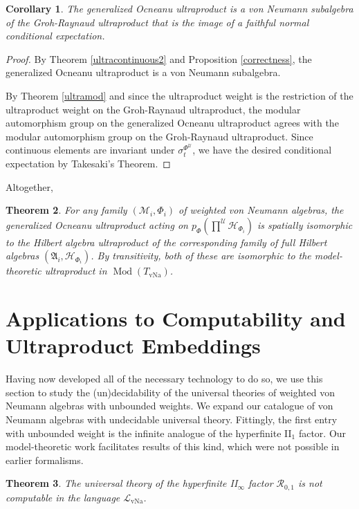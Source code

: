 \documentclass[12pt]{amsart}
\newtheorem{thm}{Theorem}[section]
\newtheorem{cor}[thm]{Corollary}
\theoremstyle{definition}
\def\cal{\mathcal}
\def \Md{\operatorname{Mod}}
\DeclareMathOperator{\vNa}{vNa}
\newcommand\cU{{\cal U}}
\newcommand\R{{\cal R}}
\begin{document}
\begin{cor}\label{GOisCornerOfGR}
    The generalized Ocneanu ultraproduct is a von Neumann subalgebra of the Groh-Raynaud ultraproduct that is the image of a faithful normal conditional expectation.
\end{cor}

\begin{proof}
    By Theorem \ref{ultracontinuous2} and Proposition \ref{correctness}, the generalized Ocneanu ultraproduct is a von Neumann subalgebra.

    By Theorem \ref{ultramod} and since the ultraproduct weight is the restriction of the ultraproduct weight on the Groh-Raynaud ultraproduct, the modular automorphism group on the generalized Ocneanu ultraproduct agrees with the modular automorphism group on the Groh-Raynaud ultraproduct.  Since continuous elements are invariant under $\sigma^{\Phi^{\cU}}_t$, we have the desired conditional expectation by Takesaki's Theorem.
\end{proof}

Altogether,

\begin{thm}
    For any family $(\cal M_i, \Phi_i)$ of weighted von Neumann algebras, the generalized Ocneanu ultraproduct acting on $p_{\Phi}(\prod^{\cU} \cal H_{\Phi_i})$ is spatially isomorphic to the Hilbert algebra ultraproduct of the corresponding family of full Hilbert algebras $(\mathfrak{A}_i, \cal H_{\Phi_i})$.  By transitivity, both of these are isomorphic to the model-theoretic ultraproduct in $\Md(T_{\vNa})$.
\end{thm}

\section{Applications to Computability and Ultraproduct Embeddings}\label{SectionUniversalTheories}

Having now developed all of the necessary technology to do so, we use this section to study the (un)decidability of the universal theories of weighted von Neumann algebras with unbounded weights.  We expand our catalogue of von Neumann algebras with undecidable universal theory.  Fittingly, the first entry with unbounded weight is the infinite analogue of the hyperfinite II$_1$ factor.  Our model-theoretic work facilitates results of this kind, which were not possible in earlier formalisms.

\begin{thm} \label{ThmUndecIIinfty}
    The universal theory of the hyperfinite II$_\infty$ factor $\R_{0,1}$ is not computable in the language $\cal L_{\vNa}$.
\end{thm}
\end{document}
